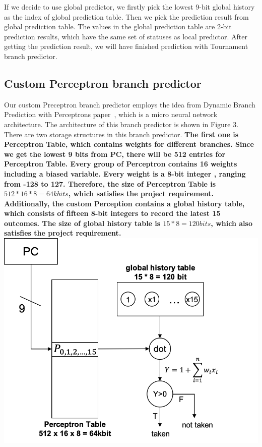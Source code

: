 \documentclass[conference]{IEEEtran}
\begin{document}
If we decide to use global predictor, we firstly pick the lowest 9-bit global history as the index of global prediction table. Then we pick the prediction result from global prediction table. 
The values in the global prediction table are 2-bit prediction results, which have the same set of statuses as local predictor. After getting the prediction result, we will have finished prediction with Tournament branch predictor. 
\subsection{Custom Perceptron branch predictor}
Our custom Preceptron branch predictor employs the idea from Dynamic Branch Prediction with Perceptrons paper~\cite{nicepaper4}, which is a micro neural network architecture. The architecture of this branch predictor is shown in Figure 3.
There are two storage structures in this branch predictor. \textbf{The first one is Perceptron Table, which contains weights for different branches. Since we get the lowest 9 bits from PC, there will be 512 entries for Perceptron Table. 
Every group of Perceptron contains 16 weights including a biased variable. Every weight is a 8-bit integer , ranging from -128 to 127. Therefore, the size of Perceptron Table is $512*16*8 = 64k  bits$, which satisfies the project requirement. 
Additionally, the custom Perception contains a global history table, which consists of fifteen 8-bit integers to record the latest 15 outcomes. The size of global history table is $15*8 = 120  bits$, which also 
satisfies the project requirement.}
\includegraphics[width=\linewidth]{perceptron.png}
\end{document}
